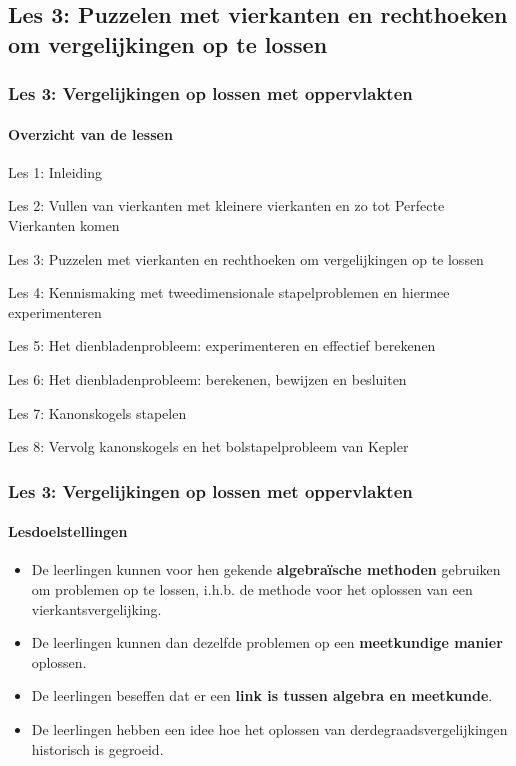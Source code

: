 \documentclass[dutch]{beamer}
\begin{document}


\subsection{Les 3: Puzzelen met vierkanten en rechthoeken om vergelijkingen op te lossen}
\begin{frame}
\frametitle{Les 3: Vergelijkingen op lossen met oppervlakten}
\framesubtitle{Overzicht van de lessen}
\begin{list}{\quad}{}
\item Les 1: Inleiding
\item Les 2: Vullen van vierkanten met kleinere vierkanten en zo tot Perfecte Vierkanten komen
\item {\color{blue}Les 3: Puzzelen met vierkanten en rechthoeken om vergelijkingen op te lossen}
\item Les 4: Kennismaking met tweedimensionale stapelproblemen en hiermee experimenteren
\item Les 5: Het dienbladenprobleem: experimenteren en effectief berekenen
\item Les 6: Het dienbladenprobleem: berekenen, bewijzen en besluiten
\item Les 7: Kanonskogels stapelen
\item Les 8: Vervolg kanonskogels en het bolstapelprobleem van Kepler
\end{list}
\end{frame}

\begin{frame}
\frametitle{Les 3: Vergelijkingen op lossen met oppervlakten}
\framesubtitle{Lesdoelstellingen}
\begin{itemize}
  \item De leerlingen kunnen voor hen gekende {\bf algebra\"ische methoden} gebruiken om problemen op te lossen, i.h.b. de methode voor het oplossen van een vierkantsvergelijking.
  \item De leerlingen kunnen dan dezelfde problemen op een {\bf meetkundige manier} oplossen.
  \item De leerlingen beseffen dat er een {\bf link is tussen algebra en meetkunde}.
  \item De leerlingen hebben een idee hoe het oplossen van derdegraadsvergelijkingen historisch is gegroeid.
\end{itemize}
\end{frame}
\end{document}

